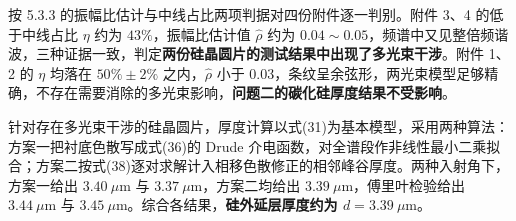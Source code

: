 按 5.3.3 的振幅比估计与中线占比两项判据对四份附件逐一判别。附件 3、4 的低于中线占比 $\eta$ 约为 $43\%$，振幅比估计值 $\hat{\rho}$ 约为 $0.04\sim0.05$，频谱中又见整倍频谐波，三种证据一致，判定{\textbf{两份硅晶圆片的测试结果中出现了多光束干涉}}。附件 1、2 的 $\eta$ 均落在 $50\%\pm2\%$ 之内，$\hat{\rho}$ 小于 0.03，条纹呈余弦形，两光束模型足够精确，不存在需要消除的多光束影响，{\textbf{问题二的碳化硅厚度结果不受影响}}。

针对存在多光束干涉的硅晶圆片，厚度计算以式(31)为基本模型，采用两种算法：方案一把衬底色散写成式(36)的 Drude 介电函数，对全谱段作非线性最小二乘拟合；方案二按式(38)逐对求解计入相移色散修正的相邻峰谷厚度。两种入射角下，方案一给出 $3.40\ \mu\mathrm{m}$ 与 $3.37\ \mu\mathrm{m}$，方案二均给出 $3.39\ \mu\mathrm{m}$，傅里叶检验给出 $3.44\ \mu\mathrm{m}$ 与 $3.45\ \mu\mathrm{m}$。综合各结果，{\textbf{硅外延层厚度约为 $d=3.39\ \mu\mathrm{m}$}}。



